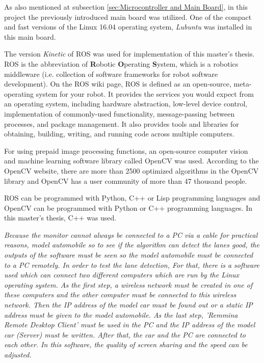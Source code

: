 As also mentioned at subsection \ref{sec:Microcontroller and Main Board}, in this project the previously introduced main board was utilized. One of the compact and fast versions of the Linux 16.04 operating system, \textit{Lubuntu} was installed in this main board.

The version \textit{Kinetic} of ROS was used for implementation of this master's thesis. ROS is the abbreviation of \textbf{R}obotic \textbf{O}perating \textbf{S}ystem, which is a robotics middleware (i.e. collection of software frameworks for robot software development). On the ROS wiki page\cite{ROS}, ROS is defined as an open-source, meta-operating system for your robot. It provides the services you would expect from an operating system, including hardware abstraction, low-level device control, implementation of commonly-used functionality, message-passing between processes, and package management. It also provides tools and libraries for obtaining, building, writing, and running code across multiple computers.

For using prepaid image processing functions, an open-source computer vision and machine learning software library called OpenCV was used. According to the OpenCV website\cite{OpenCV_About}, there are more than 2500 optimized algorithms in the OpenCV library and OpenCV has a user community of more than 47 thousand people.

ROS can be programmed with Python, C++ or Lisp programming languages and OpenCV can be programmed with Python or C++ programming languages. In this master's thesis, C++ was used.

\emph{\color{blue}Because the monitor cannot always be connected to a PC via a cable for practical reasons,  model automobile so to see if the algorithm can detect the lanes good, the outputs of the software must be seen so the model automobile must be connected to a PC remotely. In order to test the lane detection, For that, there is a software used which can connect two different computers which are run by the Linux operating system. As the first step, a wireless network must be created in one of these computers and the other computer must be connected to this wireless network. Then the IP address of the model car must be found out or a static IP address must be given to the model automobile. As the last step, 'Remmina Remote Desktop Client' must be used in the PC and the IP address of the model car (Server) must be written. After that, the car and the PC are connected to each other. In this software, the quality of screen sharing and the speed can be adjusted.  }  

